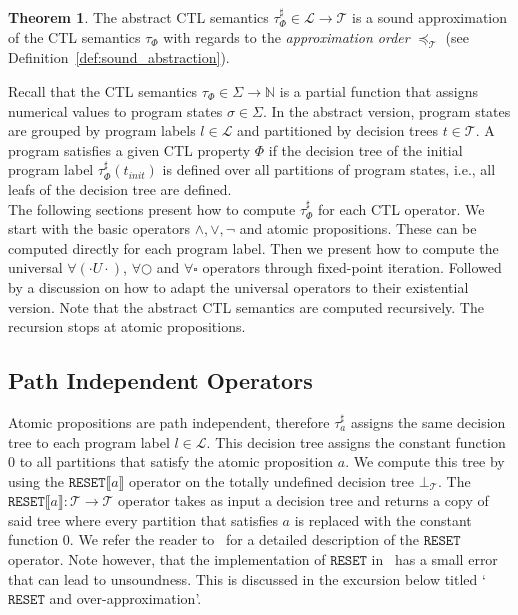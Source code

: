\documentclass[11pt,a4paper,titlepage]{article}
\theoremstyle{definition}
\newtheorem{theorem}{Theorem}[section]
\begin{document}
\begin{theorem}\label{thr:abstract_ctl_semantics}
    The abstract CTL semantics $\tau^{\sharp}_\Phi \in \mathcal{L} \rightarrow \mathcal{T}$ is a sound approximation of the
    CTL semantics $\tau_\Phi$ with regards to the \textit{approximation order} $\preceq_\mathcal{T}$ (see Definition~\ref{def:sound_abstraction}).
\end{theorem}

Recall that the CTL semantics $\tau_\Phi \in \Sigma \rightarrow \mathbb{N}$ is a partial function that 
assigns numerical values to program states $\sigma \in \Sigma$. 
In the abstract version, program states are grouped by program labels $l \in \mathcal{L}$ and
partitioned by decision trees $t \in \mathcal{T}$. 
A program satisfies a given CTL property $\Phi$ if the decision tree of the
initial program label $\tau^{\sharp}_\Phi(t_{init})$ is defined over all partitions of program states, i.e., 
all leafs of the decision tree are defined.\\

The following sections present how to compute $\tau^{\sharp}_\Phi$ for each CTL operator. 
We start with the basic operators $\land, \lor, \neg$ and atomic propositions. 
These can be computed directly for each program label. 
Then we present how to compute the universal $\forall(\cdot U \cdot)$, $\forall\bigcirc$ and $\forall\square$ operators through fixed-point iteration. 
Followed by a discussion on how to adapt the universal operators to their existential version. 
Note that the abstract CTL semantics are computed recursively. The recursion stops at atomic propositions.

\subsection{Path Independent Operators}

Atomic propositions are path independent, therefore $\tau^{\sharp}_a$ assigns the same decision tree to 
each program label $l \in \mathcal{L}$. This decision tree assigns the constant function $0$ to all partitions that satisfy the atomic proposition $a$.
We compute this tree by using the $\mathtt{RESET} \llbracket a \rrbracket$ operator on the totally undefined decision tree $\bot_\mathcal{T}$. 
The $\mathtt{RESET}\llbracket a \rrbracket \colon \mathcal{T} \rightarrow \mathcal{T}$ operator takes as input a decision tree and returns a copy of 
said tree where every partition that satisfies $a$ is replaced with the constant function $0$. We refer the reader to~\cite{UrbanPhd}
for a detailed description of the $\mathtt{RESET}$ operator. Note however, that the implementation of $\mathtt{RESET}$ in~\cite{UrbanPhd} 
has a small error that can lead to unsoundness. This is discussed in the excursion below titled `$\mathtt{RESET}$ and over-approximation'.
\end{document}
